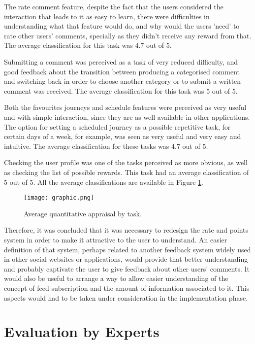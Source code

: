The rate comment feature, despite the fact that the users considered the interaction that leads to it as easy to learn, there were difficulties in understanding what that feature would do, and why would the users 'need' to rate other users' comments, specially as they didn't receive any reward from that. The average classification for this task was 4.7 out of 5.

Submitting a comment was perceived as a task of very reduced difficulty, and good feedback about the transition between producing a categorised comment and switching back in order to choose another category or to submit a written comment was received. The average classification for this task was 5 out of 5.

Both the favourites journeys and schedule features were perceived as very useful and with simple interaction, since they are as well available in other applications. The option for setting a scheduled journey as a possible repetitive task, for certain days of a week, for example, was seen as very useful and very easy and intuitive. 
The average classification for these tasks was 4.7 out of 5.

Checking the user profile was one of the tasks perceived as more obvious, as well as checking the list of possible rewards. This task had an average classification of 5 out of 5. All the average classifications are available in Figure \ref{fig:graphic}.

\begin{figure}[h!]
  \begin{center}
    \leavevmode
    \texttt{[image: graphic.png]}
    \caption{Average quantitative appraisal by task.}
    \label{fig:graphic}
  \end{center}
\end{figure}

Therefore, it was concluded that it was necessary to redesign the rate and points system in order to make it attractive to the user to understand. An easier definition of that system, perhaps related to another feedback system widely used in other social websites or applications, would provide that better understanding and probably captivate the user to give feedback about other users' comments. It would also be useful to arrange a way to allow easier understanding of the concept of feed subscription and the amount of information associated to it. This aspects would had to be taken under consideration in the implementation phase.

\section{Evaluation by Experts}

